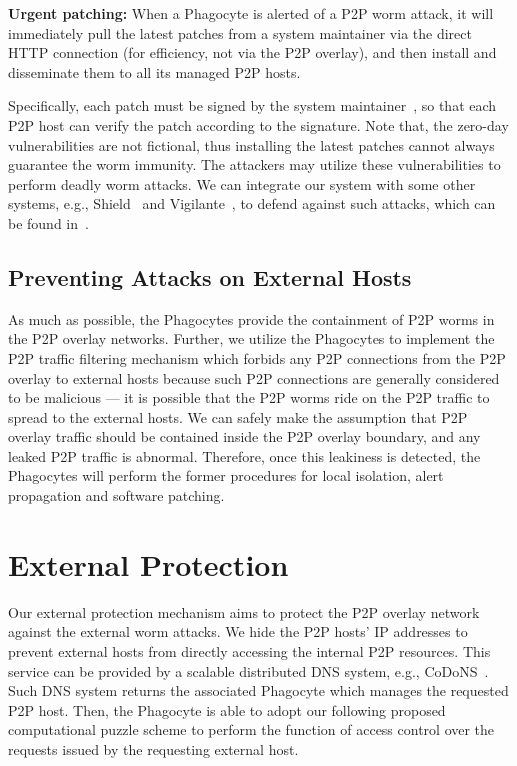 \documentclass[times,10pt,twocolumn]{article}
\begin{document}
\textbf{Urgent patching:} When a Phagocyte is alerted of a P2P worm
attack, it will immediately pull the latest patches from a system
maintainer via the direct HTTP connection (for efficiency, not via
the P2P overlay), and then install and disseminate them to all its
managed P2P hosts.



Specifically, each patch must be signed by the system
maintainer~\cite{XieSZ08}, so that each P2P host can verify the
patch according to the signature. Note that, the zero-day
vulnerabilities are not fictional, thus installing the latest
patches cannot always guarantee the worm immunity. The attackers may
utilize these vulnerabilities to perform deadly worm attacks. We can
integrate our system with some other systems, e.g.,
Shield~\cite{WangGSZ04} and Vigilante~\cite{1095824}, to defend
against such attacks, which can be found in~\cite{puzzle-Chen09}.




\subsection{Preventing Attacks on External Hosts}

As much as possible, the Phagocytes provide the containment of P2P
worms in the P2P overlay networks. Further, we utilize the
Phagocytes to implement the P2P traffic filtering mechanism which
forbids any P2P connections from the P2P overlay to external hosts
because such P2P connections are generally considered to be
malicious --- it is possible that the P2P worms ride on the P2P
traffic to spread to the external hosts. We can safely make the
assumption that P2P overlay traffic should be contained inside the
P2P overlay boundary, and any leaked P2P traffic is abnormal.
Therefore, once this leakiness is detected, the Phagocytes will
perform the former procedures for local isolation, alert propagation
and software patching.





\section{External Protection}
\label{sec:ExternalDefenses}


Our external protection mechanism aims to protect the P2P overlay
network against the external worm attacks. We hide the P2P hosts' IP
addresses to prevent external hosts from directly accessing the
internal P2P resources. This service can be provided by a scalable
distributed DNS system, e.g., CoDoNS~\cite{1015504}. Such DNS system
returns the associated Phagocyte which manages the requested P2P
host. Then, the Phagocyte is able to adopt our following proposed
computational puzzle scheme to perform the function of access
control over the requests issued by the requesting external host.
\end{document}
